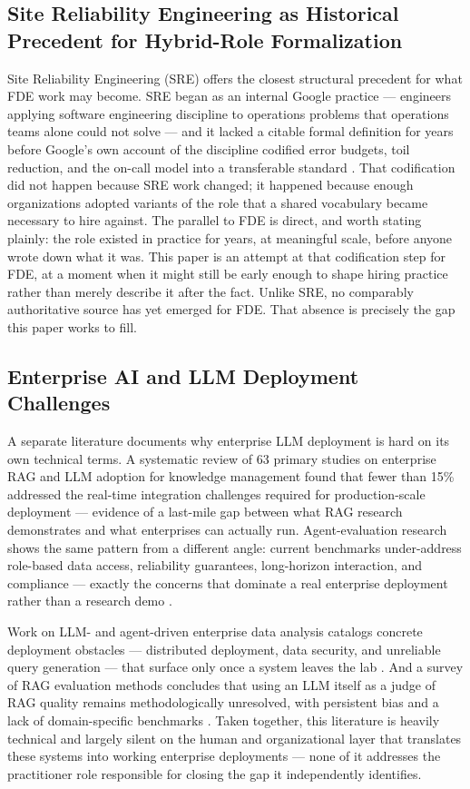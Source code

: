 \documentclass[journal]{IEEEtran}
\begin{document}
\subsection{Site Reliability Engineering as Historical Precedent for Hybrid-Role Formalization}

Site Reliability Engineering (SRE) offers the closest structural precedent for what FDE work may become. SRE began as an internal Google practice --- engineers applying software engineering discipline to operations problems that operations teams alone could not solve --- and it lacked a citable formal definition for years before Google's own account of the discipline codified error budgets, toil reduction, and the on-call model into a transferable standard \cite{beyer2016sre}. That codification did not happen because SRE work changed; it happened because enough organizations adopted variants of the role that a shared vocabulary became necessary to hire against. The parallel to FDE is direct, and worth stating plainly: the role existed in practice for years, at meaningful scale, before anyone wrote down what it was. This paper is an attempt at that codification step for FDE, at a moment when it might still be early enough to shape hiring practice rather than merely describe it after the fact. Unlike SRE, no comparably authoritative source has yet emerged for FDE. That absence is precisely the gap this paper works to fill.

\subsection{Enterprise AI and LLM Deployment Challenges}

A separate literature documents why enterprise LLM deployment is hard on its own technical terms. A systematic review of 63 primary studies on enterprise RAG and LLM adoption for knowledge management found that fewer than 15\% addressed the real-time integration challenges required for production-scale deployment \cite{karakurt2026rag} --- evidence of a last-mile gap between what RAG research demonstrates and what enterprises can actually run. Agent-evaluation research shows the same pattern from a different angle: current benchmarks under-address role-based data access, reliability guarantees, long-horizon interaction, and compliance --- exactly the concerns that dominate a real enterprise deployment rather than a research demo \cite{mohammadi2025llmagentsurvey}.

Work on LLM- and agent-driven enterprise data analysis catalogs concrete deployment obstacles --- distributed deployment, data security, and unreliable query generation --- that surface only once a system leaves the lab \cite{wang2025llmagentdataanalysis}. And a survey of RAG evaluation methods concludes that using an LLM itself as a judge of RAG quality remains methodologically unresolved, with persistent bias and a lack of domain-specific benchmarks \cite{brehme2025ragtrust}. Taken together, this literature is heavily technical and largely silent on the human and organizational layer that translates these systems into working enterprise deployments --- none of it addresses the practitioner role responsible for closing the gap it independently identifies.
\end{document}
